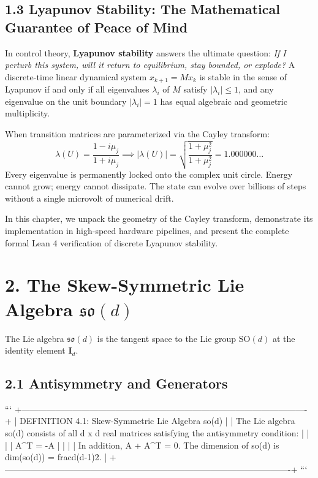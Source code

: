 \documentclass[11pt,twoside,openright]{amsbook}
\begin{document}
{{{{{{\subsection{1.3 Lyapunov Stability: The Mathematical Guarantee of Peace of Mind}
In control theory, \textbf{Lyapunov stability} answers the ultimate question: \textit{If I perturb this system, will it return to equilibrium, stay bounded, or explode?}
A discrete-time linear dynamical system $x_{k+1} = M x_k$ is stable in the sense of Lyapunov if and only if all eigenvalues $\lambda_i$ of $M$ satisfy $|\lambda_i| \le 1$, and any eigenvalue on the unit boundary $|\lambda_i| = 1$ has equal algebraic and geometric multiplicity.

When transition matrices are parameterized via the Cayley transform:
$$\lambda(U) = \frac{1 - i \mu_j}{1 + i \mu_j} \implies |\lambda(U)| = \sqrt{\frac{1 + \mu_j^2}{1 + \mu_j^2}} = 1.000000\dots$$
Every eigenvalue is permanently locked onto the complex unit circle. Energy cannot grow; energy cannot dissipate. The state can evolve over billions of steps without a single microvolt of numerical drift.

In this chapter, we unpack the geometry of the Cayley transform, demonstrate its implementation in high-speed hardware pipelines, and present the complete formal Lean 4 verification of discrete Lyapunov stability.

\section{2. The Skew-Symmetric Lie Algebra $\mathfrak{so}(d)$}

The Lie algebra $\mathfrak{so}(d)$ is the tangent space to the Lie group $\mathrm{SO}(d)$ at the identity element $\mathbf{I}_d$.

\subsection{2.1 Antisymmetry and Generators}

```
+----------------------------------------------------------------------------------------------------+
| DEFINITION 4.1: Skew-Symmetric Lie Algebra so(d)                                                   |
| The Lie algebra so(d) consists of all d x d real matrices satisfying the antisymmetry condition:    |
|                                                                                                    |
|   A^T = -A                                                                                         |
|                                                                                                    |
| In addition, A + A^T = 0. The dimension of so(d) is dim(so(d)) = frac{d(d-1)}{2}.                 |
+----------------------------------------------------------------------------------------------------+
```

}}}}}}
\end{document}
